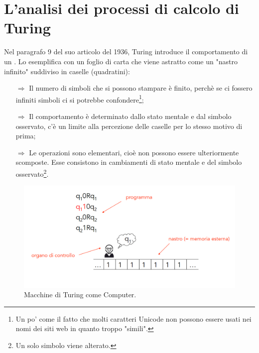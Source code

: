 
\section{L'analisi dei processi di calcolo di Turing}

Nel paragrafo 9 del suo articolo del 1936, Turing introduce
il comportamento di un . Lo esemplifica con un
foglio di carta che viene astratto come un "nastro infinito" suddiviso in
caselle (quadratini):
\begin{itemize}
    \item [$\Rightarrow$] Il numero di simboli che si possono stampare è finito,
    perchè se ci fossero infiniti simboli ci si potrebbe confondere\footnote{Un po'
    come il fatto che molti caratteri Unicode non possono essere usati nei
    nomi dei siti web in quanto troppo "simili".};
    \item [$\Rightarrow$] Il comportamento è determinato dallo stato mentale
    e dal simbolo osservato, c'è un limite alla percezione delle caselle per lo stesso
    motivo di prima;
    \item [$\Rightarrow$] Le operazioni sono elementari, cioè non possono essere
    ulteriormente scomposte. Esse consistono in cambiamenti di stato mentale e  
    del simbolo osservato\footnote{Un solo simbolo viene alterato.}.
\end{itemize}

\begin{figure}[h]
    \centering
    \includegraphics[scale = 0.35]{images/Turing.png}
    \caption{Macchine di Turing come Computer.}
\end{figure}

